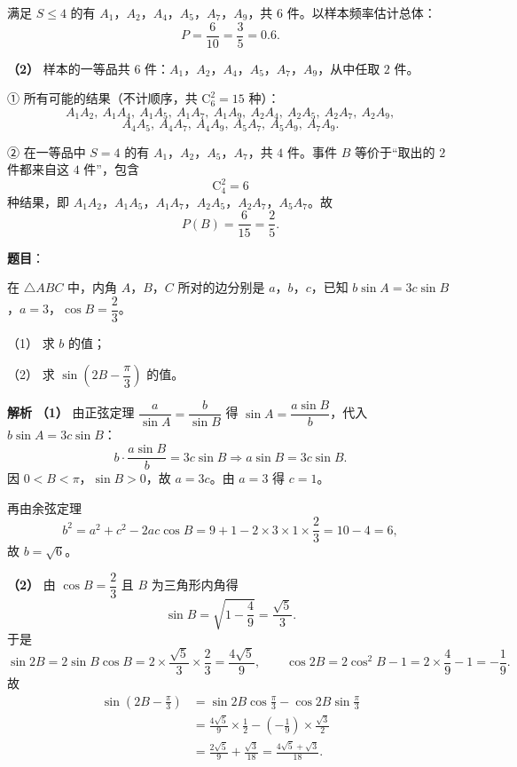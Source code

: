 \begin{answer}
满足 $S\leqslant4$ 的有 $A_1$，$A_2$，$A_4$，$A_5$，$A_7$，$A_9$，共 $6$ 件。以样本频率估计总体：
\nopagebreak[4]
\[P=\frac6{10}=\frac35=0.6.\]

\textbf{（2）} 样本的一等品共 $6$ 件：$A_1$，$A_2$，$A_4$，$A_5$，$A_7$，$A_9$，从中任取 $2$ 件。

① 所有可能的结果（不计顺序，共 $\mathrm C_6^2=15$ 种）：
\nopagebreak[4]
\[A_1A_2,\ A_1A_4,\ A_1A_5,\ A_1A_7,\ A_1A_9,\ A_2A_4,\ A_2A_5,\ A_2A_7,\ A_2A_9,\]
\nopagebreak[4]
\[A_4A_5,\ A_4A_7,\ A_4A_9,\ A_5A_7,\ A_5A_9,\ A_7A_9.\]

② 在一等品中 $S=4$ 的有 $A_1$，$A_2$，$A_5$，$A_7$，共 $4$ 件。事件 $B$ 等价于“取出的 $2$ 件都来自这 $4$ 件”，包含
\nopagebreak[4]
\[\mathrm C_4^2=6\]
种结果，即 $A_1A_2$，$A_1A_5$，$A_1A_7$，$A_2A_5$，$A_2A_7$，$A_5A_7$。故
\nopagebreak[4]
\[P(B)=\frac6{15}=\frac25.\]



\end{answer}
\begin{answer}

\textbf{题目}：

在 $\triangle ABC$ 中，内角 $A$，$B$，$C$ 所对的边分别是 $a$，$b$，$c$，已知 $b\sin A=3c\sin B$，$a=3$，$\cos B=\dfrac23$。

（1） 求 $b$ 的值；

（2） 求 $\sin\left(2B-\dfrac\pi3\right)$ 的值。

\textbf{解析}
\textbf{（1）} 由正弦定理 $\dfrac a{\sin A}=\dfrac b{\sin B}$ 得 $\sin A=\dfrac{a\sin B}b$，代入 $b\sin A=3c\sin B$：
\nopagebreak[4]
\[b\cdot\frac{a\sin B}b=3c\sin B\Longrightarrow a\sin B=3c\sin B.\]
因 $0<B<\pi$，$\sin B>0$，故 $a=3c$。由 $a=3$ 得 $c=1$。

再由余弦定理
\nopagebreak[4]
\[b^2=a^2+c^2-2ac\cos B=9+1-2\times3\times1\times\frac23=10-4=6,\]
故 $b=\sqrt6$。

\textbf{（2）} 由 $\cos B=\dfrac23$ 且 $B$ 为三角形内角得
\nopagebreak[4]
\[\sin B=\sqrt{1-\frac49}=\frac{\sqrt5}3.\]
于是
\nopagebreak[4]
\[\sin2B=2\sin B\cos B=2\times\frac{\sqrt5}3\times\frac23=\frac{4\sqrt5}9,\qquad
\cos2B=2\cos^2B-1=2\times\frac49-1=-\frac19.\]
故
\nopagebreak[4]
\[\begin{aligned}
\sin\left(2B-\frac\pi3\right)&=\sin2B\cos\frac\pi3-\cos2B\sin\frac\pi3\\
&=\frac{4\sqrt5}9\times\frac12-\left(-\frac19\right)\times\frac{\sqrt3}{2}\\
&=\frac{2\sqrt5}9+\frac{\sqrt3}{18}=\frac{4\sqrt5+\sqrt3}{18}.
\end{aligned}\]



\end{answer}
